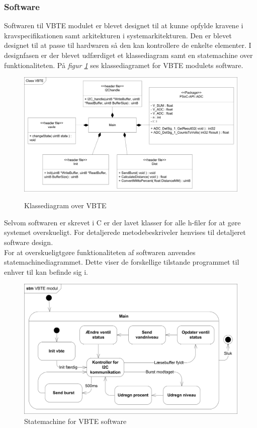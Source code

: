 \subsubsection{Software}
Softwaren til VBTE modulet er blevet designet til at kunne opfylde kravene i kravspecifikationen samt arkitekturen i systemarkitekturen. Den er blevet designet til at passe til hardwaren så den kan kontrollere de enkelte elementer. I designfasen er der blevet udfærdiget et klassediagram samt en statemachine over funktionaliteten. På \textit{figur \ref{fig:VBTEklasse} } ses klassediagramet for VBTE modulets software.
\begin{figure}[H]
\centering
\includegraphics[width=.8\textwidth]{billeder/ClassVBTE}
\label{fig:VBTEklasse}
\caption{Klassediagram over VBTE}
\end{figure}
Selvom softwaren er skrevet i C er der lavet klasser for alle h-filer for at gøre systemet overskueligt. For detaljerede metodebeskriveler henvises til detaljeret software design.\\
For at overskueligtgøre funktionaliteten af softwaren anvendes statemachinediagrammet. Dette viser de forskellige tilstande programmet til enhver til kan befinde sig i.
\begin{figure}[H]
\centering
\includegraphics[width=.8\textwidth]{billeder/STMVBTE}
\caption{Statemachine for VBTE software}
\end{figure}
